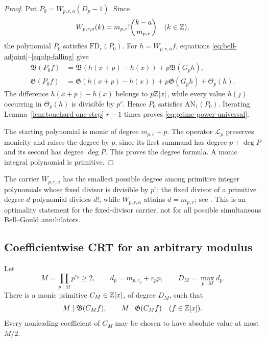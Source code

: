 \begin{proof}
Put \(P_0=W_{p,r,a}(D_p-1)\).  Since
\[
 W_{p,r,a}(k)=m_{p,r}!\binom{k-a}{m_{p,r}}
 \quad(k\in\mathbb Z),
\]
the polynomial \(P_0\) satisfies \(\mathrm{FD}_r(P_0)\).  For
\(h=W_{p,r,a}f\), equations
\eqref{eq:bell-adjoint}--\eqref{eq:dp-falling} give
\begin{align*}
 \mathfrak B(P_0f)
 &=\mathfrak B(h(x+p)-h(x))+p\mathfrak B(G_ph),\\
 \mathfrak G(P_0f)
 &=\mathfrak G(h(x+p)-h(x))+p\mathfrak G(G_ph)
   +\Theta_p(h).
\end{align*}
The difference \(h(x+p)-h(x)\) belongs to \(p\mathbb Z[x]\), while every value
\(h(j)\) occurring in \(\Theta_p(h)\) is divisible by \(p^r\).  Hence
\(P_0\) satisfies \(\mathrm{AN}_1(P_0)\).  Iterating
Lemma~\ref{lem:touchard-one-step} \(r-1\) times proves
\eqref{eq:prime-power-universal}.

The starting polynomial is monic of degree \(m_{p,r}+p\).
The operator \(\mathcal L_p\) preserves monicity and raises the degree by
\(p\), since its first summand has degree \(p+\deg P\) and its second has
degree \(\deg P\).  This proves the degree formula.  A monic integral
polynomial is primitive.
\end{proof}

The carrier \(W_{p,r,a}\) has the smallest possible degree among primitive
integer polynomials whose fixed divisor is divisible by \(p^r\): the fixed
divisor of a primitive degree-\(d\) polynomial divides \(d!\), while
\(W_{p,r,a}\) attains \(d=m_{p,r}\); see
\cite{PrasadRajkumarReddy2019}.  This is an optimality statement for the
fixed-divisor carrier, not for all possible simultaneous Bell--Gould
annihilators.

\subsection{Coefficientwise CRT for an arbitrary modulus}

\begin{theorem}
\label{thm:bell-gould-arbitrary-modulus}
Let
\[
 M=\prod_{p\mid M}p^{r_p}\geq2,
 \qquad
 d_p=m_{p,r_p}+r_pp,
 \qquad
 D_M=\max_{p\mid M}d_p.
\]
There is a monic primitive \(C_M\in\mathbb Z[x]\), of degree \(D_M\), such that
\begin{equation}\label{eq:arbitrary-modulus-universal}
 M\mid\mathfrak B(C_Mf),
 \qquad
 M\mid\mathfrak G(C_Mf)
 \quad(f\in\mathbb Z[x]).
\end{equation}
Every nonleading coefficient of \(C_M\) may be chosen to have absolute
value at most \(M/2\).
\end{theorem}

